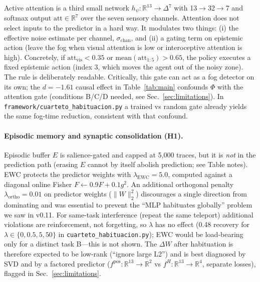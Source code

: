 \documentclass[11pt,a4paper]{article}
\begin{document}
Active attention is a third small network $h_\psi: \mathbb{R}^{13} \rightarrow \Delta^7$ with 13$\rightarrow$32$\rightarrow$7 and softmax output $\mathrm{att} \in \mathbb{R}^7$ over the seven sensory channels. Attention does not select inputs to the predictor in a hard way. It modulates two things: (i) the effective noise estimate per channel, $\sigma_{\mathrm{chan}}$, and (ii) a gating term on epistemic action (leave the fog when visual attention is low or interoceptive attention is high). Concretely, if $\mathrm{att}_{\mathrm{vis}} < 0.35$ or $\mathrm{mean}(\mathrm{att}_{1:5}) > 0.65$, the policy executes a fixed epistemic action (index 3, which moves the agent out of the noisy zone). The rule is deliberately readable. Critically, this gate can act as a fog detector on its own; the $d=-1.61$ causal effect in Table~\ref{tab:main} confounds $\Phi$ with the attention gate (conditions B/C/D needed, see Sec.~\ref{sec:limitations}). In \texttt{framework/cuarteto\_habituacion.py} a trained vs random gate already yields the same fog-time reduction, consistent with that confound.

\paragraph{Episodic memory and synaptic consolidation (H1).} Episodic buffer $E$ is salience-gated and capped at 5,000 traces, but it is \textit{not} in the prediction path (erasing $E$ cannot by itself abolish prediction; see Table notes). EWC \cite{kirkpatrick2017} protects the predictor weights with $\lambda_{\mathrm{EWC}}=5.0$, computed against a diagonal online Fisher $F \leftarrow 0.9F + 0.1 g^2$. An additional orthogonal penalty $\lambda_{\mathrm{ortho}}=0.01$ on predictor weights ($\|W\|_2^2$) discourages a single direction from dominating and was essential to prevent the ``MLP habituates globally'' problem we saw in v0.11. For same-task interference (repeat the same teleport) additional violations are reinforcement, not forgetting, so $\lambda$ has no effect (0.48 recovery for $\lambda\in\{0,0.5,5,50\}$ in \texttt{cuarteto\_habituacion.py}); EWC would be load-bearing only for a distinct task B---this is not shown. The $\Delta W$ after habituation is therefore expected to be low-rank (``ignore large L2'') and is best diagnosed by SVD and by a factored predictor ($f^{\mathrm{pos}}:\mathbb{R}^{13}\rightarrow\mathbb{R}^2$ vs $f^{H}:\mathbb{R}^{13}\rightarrow\mathbb{R}^4$, separate losses), flagged in Sec.~\ref{sec:limitations}.
\end{document}
